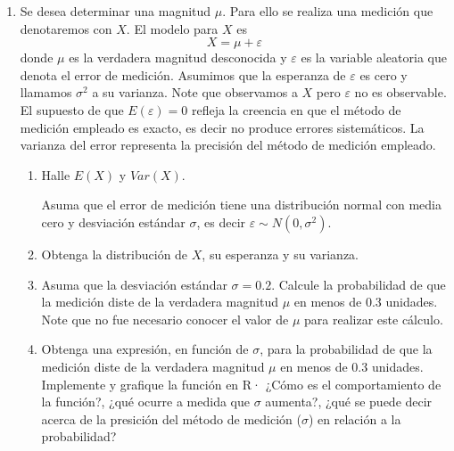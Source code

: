 \documentclass[a4paper, 11pt]{article}
\begin{document}
\begin{enumerate}
    \item Se desea determinar una magnitud $\mu$. Para ello se realiza una medición que denotaremos con $X$. El modelo para $X$ es
    \[
    X = \mu + \varepsilon
    \]
    donde $\mu$ es la verdadera magnitud desconocida y $\varepsilon$ es la variable aleatoria que denota el error de medición. Asumimos que la esperanza de $\varepsilon$ es cero y llamamos $\sigma^2$ a su varianza. Note que observamos a $X$ pero $\varepsilon$ no es observable. El supuesto de que $E(\varepsilon) = 0$ refleja la creencia en que el método de medición empleado es exacto, es decir no produce errores sistemáticos. La varianza del error representa la precisión del método de medición empleado.
    \begin{enumerate}
        \item Halle $E(X)$ y $Var(X)$.
        
        Asuma que el error de medición tiene una distribución normal con media cero y desviación estándar $\sigma$, es decir $\varepsilon \sim N(0, \sigma^2)$.
        
        \item Obtenga la distribución de $X$, su esperanza y su varianza.
        \item Asuma que la desviación estándar $\sigma = 0.2$. Calcule la probabilidad de que la medición diste de la verdadera magnitud $\mu$ en menos de 0.3 unidades. Note que no fue necesario conocer el valor de $\mu$ para realizar este cálculo.
        \item Obtenga una expresión, en función de $\sigma$, para la probabilidad de que la medición diste de la verdadera magnitud $\mu$ en menos de 0.3 unidades. Implemente y grafique la función en R· ¿Cómo es el comportamiento de la función?, ¿qué ocurre a medida que $\sigma$ aumenta?, ¿qué se puede decir acerca de la presición del método de medición ($\sigma$) en relación a la probabilidad? %
    \end{enumerate}
\end{enumerate}
\end{document}
